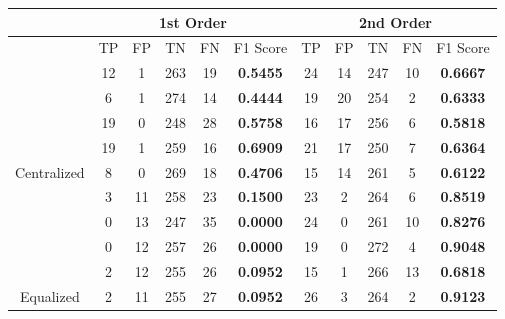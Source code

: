 \documentclass[10pt,a4paper]{article}
\begin{document}
		\begin{table}[!h]
			\centering
			\begin{tabular}{|c|c|c|c|c|c|c|c|c|c|c|}
				\hline
				& \multicolumn{5}{c|}{1st Order}                                                     & \multicolumn{5}{c|}{2nd Order}                              \\ \hline
				& TP & FP & TN  & FN                        & F1 Score                               & TP & FP & TN  & FN & F1 Score                               \\ \hline
				& 12 & 1  & 263 & {\color[HTML]{333333} 19} & {\color[HTML]{FE0000} \textbf{0.5455}} & 24 & 14 & 247 & 10 & {\color[HTML]{FE0000} \textbf{0.6667}} \\ \cline{2-11} 
				& 6  & 1  & 274 & {\color[HTML]{333333} 14} & {\color[HTML]{FE0000} \textbf{0.4444}} & 19 & 20 & 254 & 2  & {\color[HTML]{FE0000} \textbf{0.6333}} \\ \cline{2-11} 
				& 19 & 0  & 248 & {\color[HTML]{333333} 28} & {\color[HTML]{FE0000} \textbf{0.5758}} & 16 & 17 & 256 & 6  & {\color[HTML]{FE0000} \textbf{0.5818}} \\ \cline{2-11} 
				& 19 & 1  & 259 & {\color[HTML]{333333} 16} & {\color[HTML]{FE0000} \textbf{0.6909}} & 21 & 17 & 250 & 7  & {\color[HTML]{FE0000} \textbf{0.6364}} \\ \cline{2-11} 
				\multirow{-5}{*}{Centralized} & 8  & 0  & 269 & {\color[HTML]{333333} 18} & {\color[HTML]{FE0000} \textbf{0.4706}} & 15 & 14 & 261 & 5  & {\color[HTML]{FE0000} \textbf{0.6122}} \\ \hline
				& 3  & 11 & 258 & {\color[HTML]{333333} 23} & {\color[HTML]{FE0000} \textbf{0.1500}} & 23 & 2  & 264 & 6  & {\color[HTML]{FE0000} \textbf{0.8519}} \\ \cline{2-11} 
				& 0  & 13 & 247 & {\color[HTML]{333333} 35} & {\color[HTML]{FE0000} \textbf{0.0000}} & 24 & 0  & 261 & 10 & {\color[HTML]{FE0000} \textbf{0.8276}} \\ \cline{2-11} 
				& 0  & 12 & 257 & {\color[HTML]{333333} 26} & {\color[HTML]{FE0000} \textbf{0.0000}} & 19 & 0  & 272 & 4  & {\color[HTML]{FE0000} \textbf{0.9048}} \\ \cline{2-11} 
				& 2  & 12 & 255 & {\color[HTML]{333333} 26} & {\color[HTML]{FE0000} \textbf{0.0952}} & 15 & 1  & 266 & 13 & {\color[HTML]{FE0000} \textbf{0.6818}} \\ \cline{2-11} 
				\multirow{-5}{*}{Equalized}   & 2  & 11 & 255 & {\color[HTML]{333333} 27} & {\color[HTML]{FE0000} \textbf{0.0952}} & 26 & 3  & 264 & 2  & {\color[HTML]{FE0000} \textbf{0.9123}} \\ \hline
			\end{tabular}
		\end{table}
	
\end{document}
